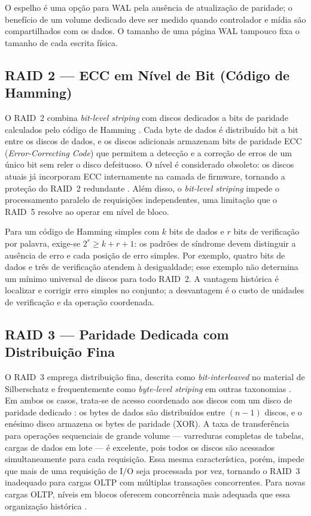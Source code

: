 \documentclass[titlepage]{article}
\begin{document}
O espelho é uma opção para WAL pela ausência de atualização de paridade; o benefício de um volume dedicado deve ser medido quando controlador e mídia são compartilhados com os dados. O tamanho de uma página WAL tampouco fixa o tamanho de cada escrita física.

\subsection{RAID 2 --- ECC em Nível de Bit (Código de Hamming)}
O RAID~2 combina \textit{bit-level striping} com discos dedicados a bits de paridade calculados pelo código de Hamming \cite{silberschatz2020}. Cada byte de dados é distribuído bit a bit entre os discos de dados, e os discos adicionais armazenam bits de paridade ECC (\textit{Error-Correcting Code}) que permitem a detecção e a correção de erros de um único bit sem reler o disco defeituoso. O nível é considerado obsoleto: os discos atuais já incorporam ECC internamente na camada de firmware, tornando a proteção do RAID~2 redundante \cite{silberschatz2020}. Além disso, o \textit{bit-level striping} impede o processamento paralelo de requisições independentes, uma limitação que o RAID~5 resolve ao operar em nível de bloco.

Para um código de Hamming simples com $k$ bits de dados e $r$ bits de verificação por palavra, exige-se $2^r\geq k+r+1$: os padrões de síndrome devem distinguir a ausência de erro e cada posição de erro simples. Por exemplo, quatro bits de dados e três de verificação atendem à desigualdade; esse exemplo não determina um mínimo universal de discos para todo RAID~2. A vantagem histórica é localizar e corrigir erro simples no conjunto; a desvantagem é o custo de unidades de verificação e da operação coordenada.

\subsection{RAID 3 --- Paridade Dedicada com Distribuição Fina}
O RAID~3 emprega distribuição fina, descrita como \textit{bit-interleaved} no material de Silberschatz e frequentemente como \textit{byte-level striping} em outras taxonomias \cite{dbbook_storage}. Em ambos os casos, trata-se de acesso coordenado aos discos com um disco de paridade dedicado \cite{silberschatz2020}: os bytes de dados são distribuídos entre $(n-1)$ discos, e o enésimo disco armazena os bytes de paridade (XOR). A taxa de transferência para operações sequenciais de grande volume --- varreduras completas de tabelas, cargas de dados em lote --- é excelente, pois todos os discos são acessados simultaneamente para cada requisição. Essa mesma característica, porém, impede que mais de uma requisição de I/O seja processada por vez, tornando o RAID~3 inadequado para cargas OLTP com múltiplas transações concorrentes. Para novas cargas OLTP, níveis em blocos oferecem concorrência mais adequada que essa organização histórica \cite{silberschatz2020}.
\end{document}
